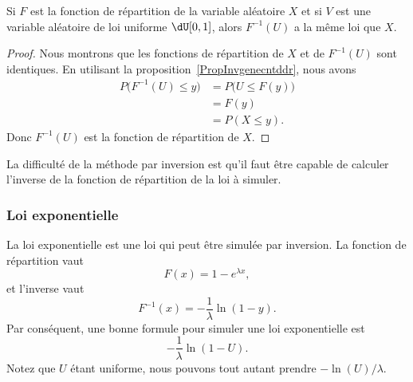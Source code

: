 \begin{proposition}
	Si \( F\) est la fonction de répartition de la variable aléatoire \( X\) et si \( V\) est une variable aléatoire de loi uniforme \( \dU\mathopen[ 0 , 1 \mathclose]\), alors \( F^{-1}(U)\) a la même loi que \( X\).
\end{proposition}

\begin{proof}
	Nous montrons que les fonctions de répartition de \( X\) et de \( F^{-1}(U)\) sont identiques. En utilisant la proposition~\ref{PropInvgenecntddr}, nous avons
	\begin{subequations}
		\begin{align}
			P\big( F^{-1}(U)\leq y \big) & =P\big( U\leq F(y) \big) \\
			                             & =F(y)                    \\
			                             & =P(X\leq y).
		\end{align}
	\end{subequations}
	Donc \( F^{-1}(U)\) est la fonction de répartition de \( X\).
\end{proof}

La difficulté de la méthode par inversion est qu'il faut être capable de calculer l'inverse de la fonction de répartition de la loi à simuler.

\subsubsection{Loi exponentielle}

La loi exponentielle est une loi qui peut être simulée par inversion. La fonction de répartition vaut
\begin{equation}
	F(x)=1- e^{\lambda x},
\end{equation}
et l'inverse vaut
\begin{equation}
	F^{-1}(x)=-\frac{1}{ \lambda }\ln(1-y).
\end{equation}
Par conséquent, une bonne formule pour simuler une loi exponentielle est
\begin{equation}
	-\frac{1}{ \lambda }\ln(1-U).
\end{equation}
Notez que \( U\) étant uniforme, nous pouvons tout autant prendre \( -\ln(U)/\lambda\).

